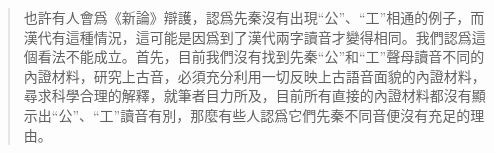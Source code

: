 \begin{quote}
也許有人會爲《新論》辯護，認爲先秦沒有出現``公''、``工''相通的例子，而漢代有這種情況，這可能是因爲到了漢代兩字讀音才變得相同。我們認爲這個看法不能成立。首先，目前我們沒有找到先秦``公''和``工''聲母讀音不同的內證材料，研究上古音，必須充分利用一切反映上古語音面貌的內證材料，尋求科學合理的解釋，就筆者目力所及，目前所有直接的內證材料都沒有顯示出``公''、``工''讀音有別，那麼有些人認爲它們先秦不同音便沒有充足的理由。


\end{quote}
